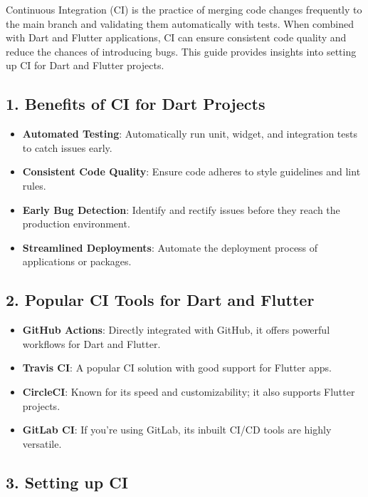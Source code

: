 \documentclass[
]{article}
\providecommand{\tightlist}{%
  \setlength{\itemsep}{0pt}\setlength{\parskip}{0pt}}
\begin{document}
Continuous Integration (CI) is the practice of merging code changes
frequently to the main branch and validating them automatically with
tests. When combined with Dart and Flutter applications, CI can ensure
consistent code quality and reduce the chances of introducing bugs. This
guide provides insights into setting up CI for Dart and Flutter
projects.

\subsection{1. Benefits of CI for Dart
Projects}\label{benefits-of-ci-for-dart-projects}

\begin{itemize}
\tightlist
\item
  \textbf{Automated Testing}: Automatically run unit, widget, and
  integration tests to catch issues early.
\item
  \textbf{Consistent Code Quality}: Ensure code adheres to style
  guidelines and lint rules.
\item
  \textbf{Early Bug Detection}: Identify and rectify issues before they
  reach the production environment.
\item
  \textbf{Streamlined Deployments}: Automate the deployment process of
  applications or packages.
\end{itemize}

\subsection{2. Popular CI Tools for Dart and
Flutter}\label{popular-ci-tools-for-dart-and-flutter}

\begin{itemize}
\tightlist
\item
  \textbf{GitHub Actions}: Directly integrated with GitHub, it offers
  powerful workflows for Dart and Flutter.
\item
  \textbf{Travis CI}: A popular CI solution with good support for
  Flutter apps.
\item
  \textbf{CircleCI}: Known for its speed and customizability; it also
  supports Flutter projects.
\item
  \textbf{GitLab CI}: If you're using GitLab, its inbuilt CI/CD tools
  are highly versatile.
\end{itemize}

\subsection{3. Setting up CI}\label{setting-up-ci}
\end{document}
